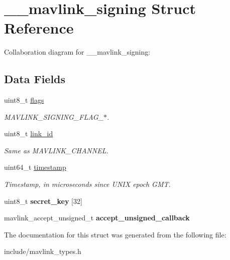\hypertarget{struct____mavlink__signing}{}\section{\+\_\+\+\_\+mavlink\+\_\+signing Struct Reference}
\label{struct____mavlink__signing}


Collaboration diagram for \+\_\+\+\_\+mavlink\+\_\+signing\+:
\subsection*{Data Fields}
\begin{DoxyCompactItemize}
\item 
uint8\+\_\+t \hyperlink{struct____mavlink__signing_aa2585d779da0ab21273a8d92de9a0ebe}{flags}\hypertarget{struct____mavlink__signing_aa2585d779da0ab21273a8d92de9a0ebe}{}\label{struct____mavlink__signing_aa2585d779da0ab21273a8d92de9a0ebe}

\begin{DoxyCompactList}\small\item\em M\+A\+V\+L\+I\+N\+K\+\_\+\+S\+I\+G\+N\+I\+N\+G\+\_\+\+F\+L\+A\+G\+\_\+$\ast$. \end{DoxyCompactList}\item 
uint8\+\_\+t \hyperlink{struct____mavlink__signing_afbb4d42ec52ad6513f559fa17040a5df}{link\+\_\+id}\hypertarget{struct____mavlink__signing_afbb4d42ec52ad6513f559fa17040a5df}{}\label{struct____mavlink__signing_afbb4d42ec52ad6513f559fa17040a5df}

\begin{DoxyCompactList}\small\item\em Same as M\+A\+V\+L\+I\+N\+K\+\_\+\+C\+H\+A\+N\+N\+EL. \end{DoxyCompactList}\item 
uint64\+\_\+t \hyperlink{struct____mavlink__signing_a465bef81f6478756e5443025b1f2ddfa}{timestamp}\hypertarget{struct____mavlink__signing_a465bef81f6478756e5443025b1f2ddfa}{}\label{struct____mavlink__signing_a465bef81f6478756e5443025b1f2ddfa}

\begin{DoxyCompactList}\small\item\em Timestamp, in microseconds since U\+N\+IX epoch G\+MT. \end{DoxyCompactList}\item 
uint8\+\_\+t {\bfseries secret\+\_\+key} \mbox{[}32\mbox{]}\hypertarget{struct____mavlink__signing_a10d36261aa45f52a00f353301fdbccd0}{}\label{struct____mavlink__signing_a10d36261aa45f52a00f353301fdbccd0}

\item 
mavlink\+\_\+accept\+\_\+unsigned\+\_\+t {\bfseries accept\+\_\+unsigned\+\_\+callback}\hypertarget{struct____mavlink__signing_af207e8d6905574528cc90ac0d00437c4}{}\label{struct____mavlink__signing_af207e8d6905574528cc90ac0d00437c4}

\end{DoxyCompactItemize}


The documentation for this struct was generated from the following file\+:\begin{DoxyCompactItemize}
\item 
include/mavlink\+\_\+types.\+h\end{DoxyCompactItemize}
